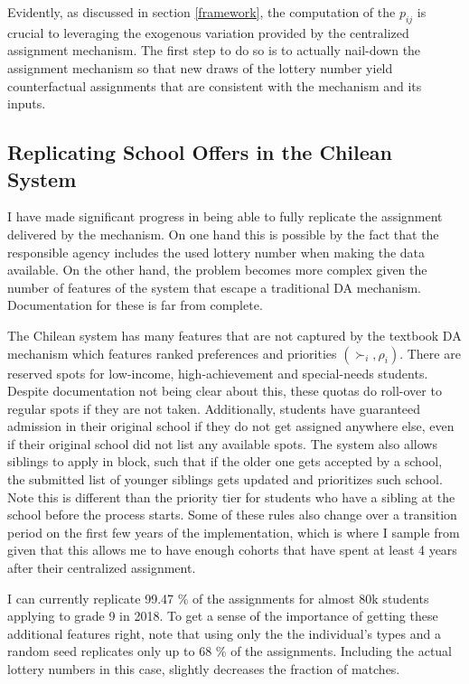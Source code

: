 \documentclass[a4paper, article, english, oneside, unknownkeysallowed, 12pt]{memoir}
\begin{document}
Evidently, as discussed in section \ref{framework}, the computation of the $p_{ij}$ is crucial to leveraging the exogenous variation provided by the centralized assignment mechanism.
The first step to do so is to actually nail-down the assignment mechanism so that new draws of the lottery number yield counterfactual assignments that are consistent with the mechanism and its inputs.

\subsection{Replicating School Offers in the Chilean System}

I have made significant progress in being able to fully replicate the assignment delivered by the mechanism. On one hand this is possible by the fact that the responsible agency includes the used lottery number when making the data available. 
On the other hand, the problem becomes more complex given the number of features of the system that escape a traditional DA mechanism. Documentation for these is far from complete.

The Chilean system has many features that are not captured by the textbook DA mechanism which features ranked preferences and priorities $(\succ_i, \rho_i)$.
There are reserved spots for low-income, high-achievement and special-needs students. Despite documentation not being clear about this,
these quotas do roll-over to regular spots if they are not taken. Additionally, students have guaranteed admission in their original school if they do not get assigned anywhere else, even if their original school did not list any available spots.
The system also allows siblings to apply in block, such that if the older one gets accepted by a school, the submitted list of younger siblings gets updated and prioritizes such school. Note this is different than the priority tier for students who have a sibling at the school before the process starts. 
Some of these rules also change over a transition period on the first few years of the implementation, which is where I sample from given that this allows me to have enough cohorts that have spent at least 4 years after their centralized assignment.

I can currently replicate 99.47 \% of the assignments for almost 80k students applying to grade 9 in 2018.
To get a sense of the importance of getting these additional features right, note that using only the the individual's types and a random seed replicates only up to 68 \% of the assignments.
Including the actual lottery numbers in this case, slightly decreases the fraction of matches.
\end{document}
